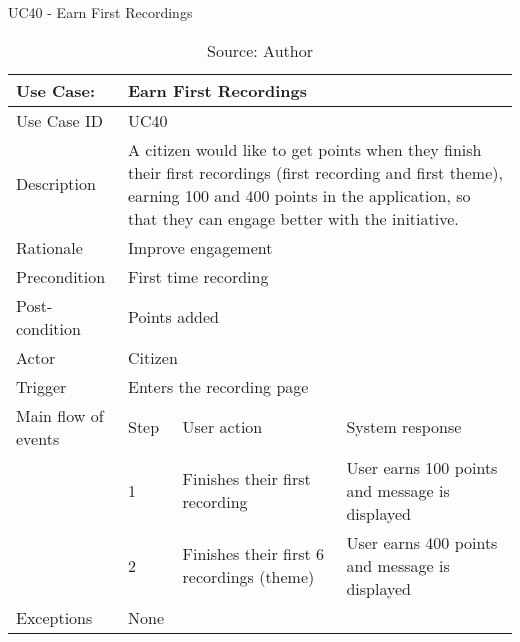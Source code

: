 \begin{table}[ht]
\centering
\caption{UC40 - Earn First Recordings}
\label{uc:40}
\begin{tabular}{|p{3cm}|p{1cm}|p{5cm}|p{5cm}|}
\hline
Use Case:       & \multicolumn{3}{p{11cm}|}{Earn First Recordings} \\ \hline
Use Case ID     & \multicolumn{3}{p{11cm}|}{UC40} \\ \hline
Description     & \multicolumn{3}{p{11cm}|}{A citizen would like to get points when they finish their first recordings (first recording and first theme), earning 100 and 400 points in the application, so that they can engage better with the initiative.} \\ \hline
Rationale       & \multicolumn{3}{p{11cm}|}{Improve engagement} \\ \hline
Precondition    & \multicolumn{3}{p{11cm}|}{First time recording} \\ \hline
Post-condition  & \multicolumn{3}{p{11cm}|}{Points added} \\ \hline
Actor           & \multicolumn{3}{p{11cm}|}{Citizen} \\ \hline
Trigger         & \multicolumn{3}{p{11cm}|}{Enters the recording page} \\ \hline
Main flow of events & Step  & User action & System response \\ \hline
                    & 1     & Finishes their first recording & User earns 100 points and message is displayed  \\ \hline
                    & 2     & Finishes their first 6 recordings (theme) & User earns 400 points and message is displayed \\ \hline
Exceptions      & \multicolumn{3}{p{11cm}|}{None} \\ \hline
\end{tabular}
\caption*{Source: Author}
\end{table}


